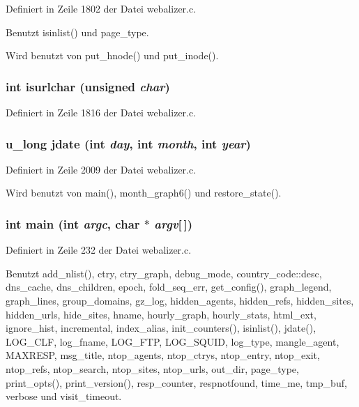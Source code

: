 Definiert in Zeile 1802 der Datei webalizer.c.

Benutzt isinlist() und page\_\-type.

Wird benutzt von put\_\-hnode() und put\_\-inode().
\subsubsection{\setlength{\rightskip}{0pt plus 5cm}int isurlchar (unsigned {\em char})}\label{webalizer_8c_6889c498251013344e6bcd437b077db0}




Definiert in Zeile 1816 der Datei webalizer.c.
\subsubsection{\setlength{\rightskip}{0pt plus 5cm}u\_\-long jdate (int {\em day}, int {\em month}, int {\em year})}\label{webalizer_8c_8fb8978d91b70fd80d00d381cb115731}




Definiert in Zeile 2009 der Datei webalizer.c.

Wird benutzt von main(), month\_\-graph6() und restore\_\-state().
\subsubsection{\setlength{\rightskip}{0pt plus 5cm}int main (int {\em argc}, char $\ast$ {\em argv}[$\,$])}\label{webalizer_8c_0ddf1224851353fc92bfbff6f499fa97}




Definiert in Zeile 232 der Datei webalizer.c.

Benutzt add\_\-nlist(), ctry, ctry\_\-graph, debug\_\-mode, country\_\-code::desc, dns\_\-cache, dns\_\-children, epoch, fold\_\-seq\_\-err, get\_\-config(), graph\_\-legend, graph\_\-lines, group\_\-domains, gz\_\-log, hidden\_\-agents, hidden\_\-refs, hidden\_\-sites, hidden\_\-urls, hide\_\-sites, hname, hourly\_\-graph, hourly\_\-stats, html\_\-ext, ignore\_\-hist, incremental, index\_\-alias, init\_\-counters(), isinlist(), jdate(), LOG\_\-CLF, log\_\-fname, LOG\_\-FTP, LOG\_\-SQUID, log\_\-type, mangle\_\-agent, MAXRESP, msg\_\-title, ntop\_\-agents, ntop\_\-ctrys, ntop\_\-entry, ntop\_\-exit, ntop\_\-refs, ntop\_\-search, ntop\_\-sites, ntop\_\-urls, out\_\-dir, page\_\-type, print\_\-opts(), print\_\-version(), resp\_\-counter, respnotfound, time\_\-me, tmp\_\-buf, verbose und visit\_\-timeout.

